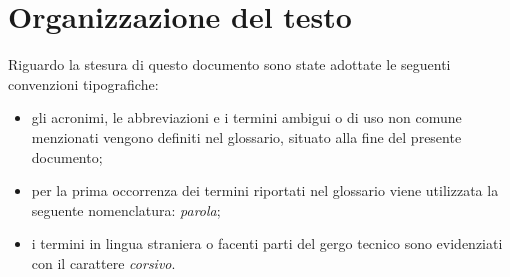 \section{Organizzazione del testo}
Riguardo la stesura di questo documento sono state adottate le seguenti convenzioni tipografiche:
\begin{itemize}
	\item gli acronimi, le abbreviazioni e i termini ambigui o di uso non comune menzionati vengono definiti nel glossario, situato alla fine del presente documento;
	\item per la prima occorrenza dei termini riportati nel glossario viene utilizzata la seguente nomenclatura: \emph{parola}\glo;
	\item i termini in lingua straniera o facenti parti del gergo tecnico sono evidenziati con il carattere \emph{corsivo}.
\end{itemize}